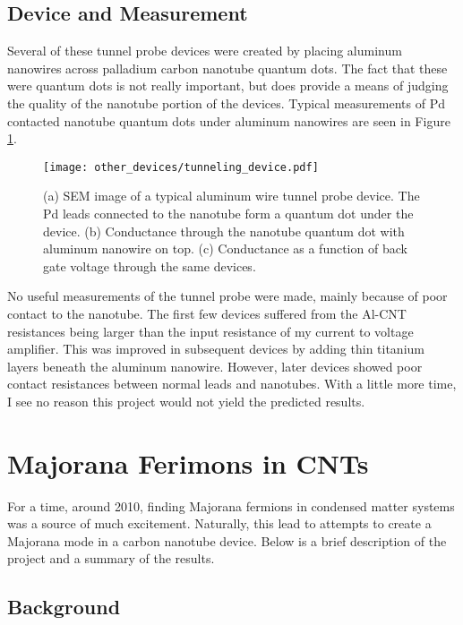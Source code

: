 \subsection{Device and Measurement}

Several of these tunnel probe devices were created by placing aluminum nanowires across palladium carbon nanotube quantum dots. The fact that these were quantum dots is not really important, but does provide a means of judging the quality of the nanotube portion of the devices. Typical measurements of Pd contacted nanotube quantum dots under aluminum nanowires are seen in Figure \ref{fig:tunneling_device}.

\begin{figure}
    \centering
    \texttt{[image: other\_devices/tunneling\_device.pdf]}
    \caption{(a) SEM image of a typical aluminum wire tunnel probe device. The Pd leads connected to the nanotube form a quantum dot under the device. (b) Conductance through the nanotube quantum dot with aluminum nanowire on top. (c) Conductance as a function of back gate voltage through the same devices.}
    \label{fig:tunneling_device}
\end{figure}

No useful measurements of the tunnel probe were made, mainly because of poor contact to the nanotube. The first few devices suffered from the Al-CNT resistances being larger than the input resistance of my current to voltage amplifier. This was improved in subsequent devices by adding thin titanium layers beneath the aluminum nanowire. However, later devices showed poor contact resistances between normal leads and nanotubes. With a little more time, I see no reason this project would not yield the predicted results.

\section{Majorana Ferimons in CNTs}
\label{sec:majorana}

For a time, around 2010, finding Majorana fermions in condensed matter systems was a source of much excitement. Naturally, this lead to attempts to create a Majorana mode in a carbon nanotube device. Below is a brief description of the project and a summary of the results.

\subsection{Background}

